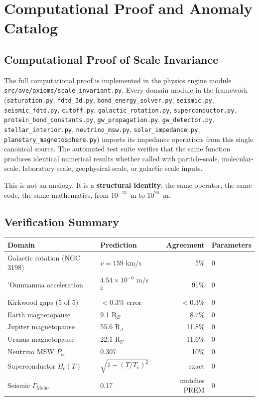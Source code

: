 
\chapter{Computational Proof and Anomaly Catalog}
\label{ch:computational_proof}

\section{Computational Proof of Scale Invariance}

The full computational proof is implemented in the physics engine module
\texttt{src/ave/axioms/scale\_invariant.py}. Every domain module in the
framework (\texttt{saturation.py}, \texttt{fdtd\_3d.py},
\texttt{bond\_energy\_solver.py}, \texttt{seismic.py},
\texttt{seismic\_fdtd.py}, \texttt{cutoff.py},
\texttt{galactic\_rotation.py}, \texttt{superconductor.py},
\texttt{protein\_bond\_constants.py},
\texttt{gw\_propagation.py},
\texttt{gw\_detector.py},
\texttt{stellar\_interior.py},
\texttt{neutrino\_msw.py},
\texttt{solar\_impedance.py},
\texttt{planetary\_magnetosphere.py}) imports its impedance
operations from this single canonical source. The automated test suite
verifies that the same
function produces identical numerical results whether called with
particle-scale, molecular-scale, laboratory-scale, geophysical-scale,
or galactic-scale inputs.

This is not an analogy. It is a \textbf{structural identity}: the same
operator, the same code, the same mathematics, from $10^{-13}$~m to
$10^{26}$~m.

\section{Verification Summary}

\begin{center}
\small
\begin{tabular}{llrl}
\toprule
\textbf{Domain} & \textbf{Prediction} & \textbf{Agreement} & \textbf{Parameters} \\
\midrule
Galactic rotation (NGC 3198) & $v = 159$ km/s & 5\% & 0 \\
'Oumuamua acceleration & $4.54 \times 10^{-6}$ m/s$^2$ & 91\% & 0 \\
Kirkwood gaps (5 of 5) & $< 0.3\%$ error & $< 0.3\%$ & 0 \\
Earth magnetopause & 9.1 R$_E$ & 8.7\% & 0 \\
Jupiter magnetopause & 55.6 R$_J$ & 11.8\% & 0 \\
Uranus magnetopause & 22.1 R$_U$ & 11.6\% & 0 \\
Neutrino MSW $P_{ee}$ & 0.307 & 10\% & 0 \\
Superconductor $B_c(T)$ & $\sqrt{1-(T/T_c)^2}$ & exact & 0 \\
Seismic $\Gamma_{\text{Moho}}$ & 0.17 & matches PREM & 0 \\
\bottomrule
\end{tabular}
\end{center}

